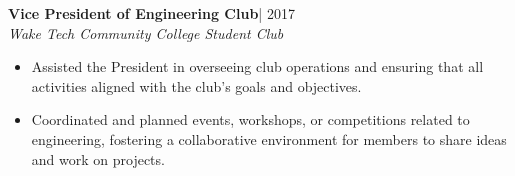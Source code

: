 \documentclass[10pt]{article}
\begin{document}
\textbf{\large Vice President of Engineering Club}|   \hfill {2017}\\
\emph{Wake Tech Community College Student Club}
\begin{itemize}
        \item[{\color[RGB]{10,0,254}$\bullet$}] \noindent Assisted the President in overseeing club operations and ensuring that all activities aligned with the club's goals and objectives.
        \item[{\color[RGB]{10,0,254}$\bullet$}] \noindent Coordinated and planned events, workshops, or competitions related to engineering, fostering a collaborative environment for members to share ideas and work on projects.
	\end{itemize}
\end{document}

